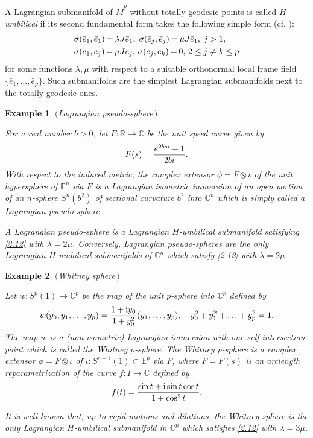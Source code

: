 \documentclass{amsart}
\theoremstyle{plain}
\newtheorem{example}{Example}[section]
\numberwithin{equation}{section}
\theoremstyle{remark}
\numberwithin{equation}{section}
\begin{document}
 A Lagrangian submanifold of $\tilde M^p$ without totally geodesic points is called {\it $H$-umbilical\/} if its second
fundamental form takes the following simple form (cf. \cite{c4.1}):  \begin{equation} \begin{aligned} \label{2.12}&
\sigma(\bar e_1,\bar e_1)\hskip-.01in =\hskip-.01in  \lambda J\bar e_1,\; \sigma(\bar e_j,\bar e_j)\hskip-.01in =\hskip-.01in \mu
J\bar e_1, \; j>1,\\ & \sigma(\bar e_1,\bar e_j)\hskip-.01in =\hskip-.01in \mu  J\bar e_j,\, \sigma(\bar e_j,\bar e_k)\hskip-.01in =\hskip-.01in 0,\, 2\leq j\ne k\leq p \end{aligned}\end{equation}
  for some  functions $\lambda,\mu$ with respect to a suitable
orthonormal local frame field $\{\bar e_1,\ldots,\bar e_p\}$.
Such submanifolds are the simplest Lagrangian submanifolds   next to the totally geodesic ones.

\begin{example} $($Lagrangian pseudo-sphere\,$)$ {\rm  For a real number $b>0$, let $F:{\mathbb R}\to {\mathbb C}$ be the unit speed curve given by
$$F(s)={{e^{2bsi}+1}\over{2bi}}.$$ 
With respect to the induced metric, the complex extensor $\phi=F\otimes \iota$ of the unit hypersphere of ${\mathbb E}^n$ via $F$ is a Lagrangian isometric immersion of an open portion of an $n$-sphere $S^n(b^2)$ of  sectional curvature $b^2$ into ${\mathbb C}^n$ which is simply called a {\it Lagrangian pseudo-sphere.}

A Lagrangian pseudo-sphere is a Lagrangian $H$-umbilical submanifold satisfying \eqref{2.12} with $\lambda=2\mu$. Conversely,  Lagrangian pseudo-spheres are the only Lagrangian $H$-umbilical submanifolds of ${\mathbb C}^n$ which satisfy \eqref{2.12}  with $\lambda=2\mu$.}\end{example}

\begin{example} $($Whitney sphere\,$)$ {\rm  Let $w:S^p(1)\rightarrow {\mathbb C}^p$ be the map of the unit $p$-sphere into ${\mathbb C}^{p}$ defined by
$$w(y_0,y_1,\ldots,y_p)={{1+{\rm i}y_0}\over {1+y_0^2}}( y_1,\ldots,y_p),\quad y_0^2+y_1^2+\ldots+y_p^2=1.$$
The map $w$ is a (non-isometric) Lagrangian immersion  with one self-intersection point which is called the {\it Whitney $p$-sphere.}  The Whitney
$p$-sphere is a complex extensor $\phi=F\otimes\iota$ of  $\iota:S^{p-1}(1) \subset \mathbb E^p$ via $F$, where $F=F(s)$
is an arclength reparametrization of the  curve  $f:I\rightarrow {\mathbb C}$ defined  by
$$f(t)={{\sin t+{\rm i}\sin t \cos t }\over{1+\cos^2 t}}.$$  

It is well-known that, up to rigid motions and dilations, the Whitney  sphere is the only Lagrangian $H$-umbilical submanifold in ${\mathbb C}^{p}$ which satisfies \eqref{2.12} with $\lambda=3\mu$.}\end{example}
\end{document}
